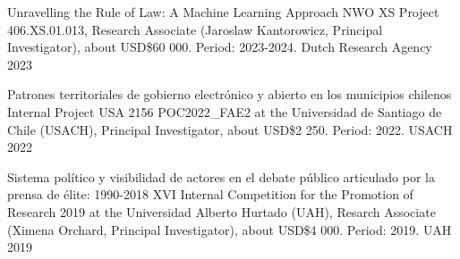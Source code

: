 \begin{cvhonors}
\cvhonor
{Unravelling the Rule of Law: A Machine Learning Approach}
{NWO XS Project 406.XS.01.013, Research Associate (Jaroslaw Kantorowicz, Principal Investigator), about USD\$60 000. Period: 2023-2024.} %
{Dutch Research Agency}
{2023}
\end{cvhonors}

\vspace{1mm}

\begin{cvhonors}
\cvhonor
{Patrones territoriales de gobierno electrónico y abierto en los municipios chilenos}
{Internal Project USA 2156 POC2022\_FAE2 at the Universidad de Santiago de Chile (USACH), Principal Investigator, about USD\$2 250. Period: 2022.} %
{USACH}
{2022}
\end{cvhonors}

\vspace{1mm}

\begin{cvhonors}
\cvhonor
{Sistema político y visibilidad de actores en el debate público articulado por la prensa de élite: 1990-2018}
{XVI Internal Competition for the Promotion of Research 2019 at the Universidad Alberto Hurtado (UAH), Resarch Associate (Ximena Orchard, Principal Investigator), about USD\$4 000. Period: 2019.} %
{UAH}
{2019}
\end{cvhonors}

\vspace{1mm}


